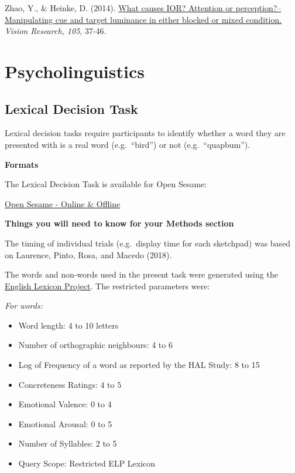 \documentclass[
]{book}
\providecommand{\tightlist}{%
  \setlength{\itemsep}{0pt}\setlength{\parskip}{0pt}}
\begin{document}
Zhao, Y., \& Heinke, D. (2014). \href{https://core.ac.uk/download/pdf/185482615.pdf}{What causes IOR? Attention or perception?--Manipulating cue and target luminance in either blocked or mixed condition.} \emph{Vision Research, 105}, 37-46.

\hypertarget{psycholinguistics}{%
\chapter{Psycholinguistics}\label{psycholinguistics}}

\hypertarget{lexical-decision-task}{%
\section{Lexical Decision Task}\label{lexical-decision-task}}

Lexical decision tasks require participants to identify whether a word they are presented with is a real word (e.g.~``bird'') or not (e.g.~``quapbum'').

\textbf{Formats}

The Lexical Decision Task is available for Open Sesame:

\href{https://github.com/jmattschey/MScConversionExperiments/blob/master/GitHub/LexicalDecisionTask.zip}{Open Sesame - Online \& Offline}

\textbf{Things you will need to know for your Methods section}

The timing of individual trials (e.g.~display time for each sketchpad) was based on Laurence, Pinto, Rosa, and Macedo (2018).

The words and non-words used in the present task were generated using the \href{https://elexicon.wustl.edu/}{English Lexicon Project}. The restricted parameters were:

\emph{For words:}

\begin{itemize}
\tightlist
\item
  Word length: 4 to 10 letters
\item
  Number of orthographic neighbours: 4 to 6
\item
  Log of Frequency of a word as reported by the HAL Study: 8 to 15
\item
  Concreteness Ratings: 4 to 5
\item
  Emotional Valence: 0 to 4
\item
  Emotional Arousal: 0 to 5
\item
  Number of Syllables: 2 to 5
\item
  Query Scope: Restricted ELP Lexicon
\end{itemize}
\end{document}
